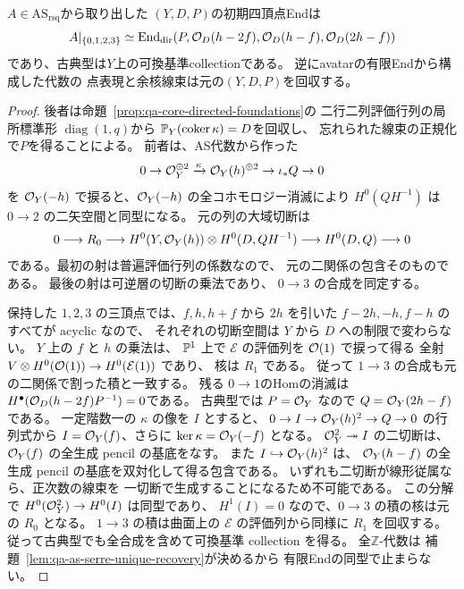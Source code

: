 \begin{proposition}[有限Endと全代数の相互逆性]
\label{prop:qa-as-inverse-foundations}
$A\in\mathrm{AS}_{\mathrm{rsq}}$から取り出した
$(Y,D,P)$の初期四頂点Endは
\[
A|_{\{0,1,2,3\}}\simeq
\operatorname{End}_{\mathrm{dir}}
(P,\mathcal O_D(h-2f),\mathcal O_D(h-f),\mathcal O_D(2h-f))
\]
であり、古典型は$Y$上の可換基準collectionである。
逆にavatarの有限Endから構成した代数の
点表現と余核線束は元の$(Y,D,P)$を回収する。
\end{proposition}
\begin{proof}
後者は命題~\ref{prop:qa-core-directed-foundations}の
二行二列評価行列の局所標準形
$\operatorname{diag}(1,q)$から
$\mathbb P_Y(\operatorname{coker}\kappa)=D$を回収し、
忘れられた線束の正規化で$P$を得ることによる。
前者は、AS代数から作った
\[
0\to\mathcal O_Y^{\oplus2}\xrightarrow{\kappa}
\mathcal O_Y(h)^{\oplus2}\to\iota_*Q\to0
\]
を $\mathcal O_Y(-h)$ で捩ると、$\mathcal O_Y(-h)$ の全コホモロジー消滅により
$H^0(QH^{-1})$ は $0\to2$ の二矢空間と同型になる。
元の列の大域切断は
\[
 0\longrightarrow R_0\longrightarrow
 H^0(Y,\mathcal O_Y(h))\otimes H^0(D,QH^{-1})
 \longrightarrow H^0(D,Q)\longrightarrow0
\]
である。最初の射は普遍評価行列の係数なので、
元の二関係の包含そのものである。
最後の射は可逆層の切断の乗法であり、
$0\to3$ の合成を同定する。

保持した $1,2,3$ の三頂点では、$f,h,h+f$ から $2h$ を引いた
$f-2h,-h,f-h$ のすべてが acyclic なので、
それぞれの切断空間は $Y$ から $D$ への制限で変わらない。
$Y$ 上の $f$ と $h$ の乗法は、
$\mathbb P^1$ 上で $\mathcal E$ の評価列を $\mathcal O(1)$ で捩って得る
全射 $V\otimes H^0(\mathcal O(1))\to H^0(\mathcal E(1))$ であり、
核は $R_1$ である。
従って $1\to3$ の合成も元の二関係で割った積と一致する。
残る
$0\to1$のHomの消滅は
$H^\bullet(\mathcal O_D(h-2f)P^{-1})=0$である。
古典型では $P=\mathcal O_Y$ なので $Q=\mathcal O_Y(2h-f)$ である。
一定階数一の $\kappa$ の像を $I$ とすると、
$0\to I\to\mathcal O_Y(h)^2\to Q\to0$ の行列式から
$I=\mathcal O_Y(f)$、さらに $\ker\kappa=\mathcal O_Y(-f)$ となる。
$\mathcal O_Y^2\twoheadrightarrow I$ の二切断は、
$\mathcal O_Y(f)$ の全生成 pencil の基底をなす。
また $I\hookrightarrow\mathcal O_Y(h)^2$ は、
$\mathcal O_Y(h-f)$ の全生成 pencil の基底を双対化して得る包含である。
いずれも二切断が線形従属なら、正次数の線束を
一切断で生成することになるため不可能である。
この分解で $H^0(\mathcal O_Y^2)\to H^0(I)$ は同型であり、
$H^1(I)=0$ なので、$0\to3$ の積の核は元の $R_0$ となる。
$1\to3$ の積は曲面上の $\mathcal E$ の評価列から同様に $R_1$ を回収する。
従って古典型でも全合成を含めて可換基準 collection を得る。
全$\mathbb Z$-代数は
補題~\ref{lem:qa-as-serre-unique-recovery}が決めるから
有限Endの同型で止まらない。
\end{proof}

